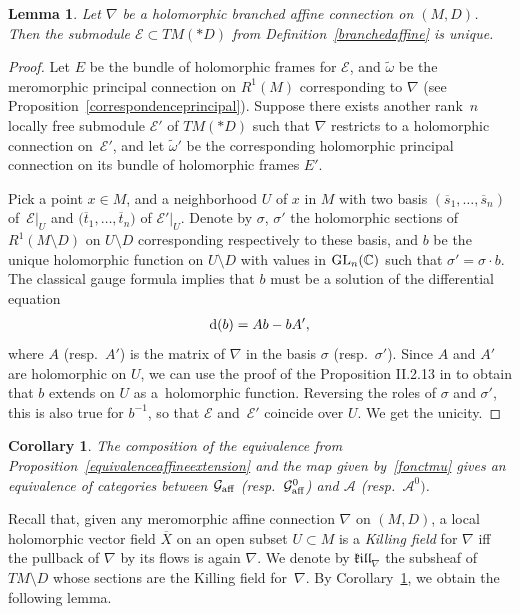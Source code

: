 \documentclass[pdftex]{sigma}
\numberwithin{equation}{section}
\newtheorem{Corollary}[Theorem]{Corollary}
\newtheorem{Lemma}[Theorem]{Lemma}
\begin{document}
 \begin{Lemma}\label{lemmabranchedaffine} Let $\nabla$ be a holomorphic branched affine connection on $(M,D)$. Then the submodule $\mathcal{E}\subset TM(* D)$ from Definition~{\rm \ref{branchedaffine}} is unique. \end{Lemma}
 \begin{proof} Let $E$ be the bundle of holomorphic frames for $\mathcal{E}$, and $\tilde{\omega}$ be the meromorphic principal connection on $R^1(M)$ corresponding to $\nabla$ (see Proposition~\ref{correspondenceprincipal}). Suppose there exists another rank~$n$ locally free submodule $\mathcal{E}'$ of $TM(* D)$ such that $\nabla$ restricts to a holomorphic connection on~$\mathcal{E}'$, and let $\tilde{\omega}'$ be the corresponding holomorphic principal connection on its bundle of holomorphic frames $E'$.

 Pick a point $x\in M$, and a neighborhood $U$ of $x$ in $M$ with two basis $(\overline{s}_1,\dots,\overline{s}_n)$ of~$\mathcal{E}\vert_U$ and $\big(\overline{t}_1,\dots,\overline{t}_n\big)$ of $\mathcal{E}'\vert_U$. Denote by $\sigma$, $\sigma'$ the holomorphic sections of $R^1(M\setminus D)$ on $U\setminus D$ corresponding respectively to these basis, and $b$ be the unique holomorphic function on $U\setminus D$ with values in ${\rm GL}_n(\mathbb{C})$ such that $\sigma'=\sigma\cdot b$. The classical gauge formula implies that $b$ must be a solution of the differential equation
 \begin{gather*} {\rm d}(b) = Ab - bA', \end{gather*}
 where $A$ (resp.\ $A'$) is the matrix of $\nabla$ in the basis $\sigma$ (resp.\ $\sigma'$). Since $A$ and $A'$ are holomorphic on $U$, we can use the proof of the Proposition II.2.13 in \cite{Sabbah} to obtain that $b$ extends on $U$ as a~holomorphic function. Reversing the roles of $\sigma$ and $\sigma'$, this is also true for $b^{-1}$, so that $\mathcal{E}$ and~$\mathcal{E}'$ coincide over $U$. We get the unicity.
 \end{proof}

\begin{Corollary}\label{equivalencetorsion} The composition of the equivalence from Proposition~{\rm \ref{equivalenceaffineextension}} and the map given by~\eqref{fonctmu} gives an equivalence of categories between $\mathcal{G}_{\rm aff}$ \big(resp.\ $\mathcal{G}_{\rm aff}^0$\big) and $\mathcal{A}$ \big(resp.\ $\mathcal{A}^0\big)$.
\end{Corollary}
Recall that, given any meromorphic affine connection $\nabla$ on $(M,D)$, a local holomorphic vector field $\overline{X}$ on an open subset $U\subset M$ is a \textit{Killing field} for $\nabla$ iff the pullback of $\nabla$ by its flows is again $\nabla$. We denote by $\mathfrak{k}\mathfrak{i}\mathfrak{l}\mathfrak{l}_{\nabla}$ the subsheaf of $TM\setminus D$ whose sections are the Killing field for~$\nabla$. By Corollary~\ref{equivalencetorsion}, we obtain the following lemma.
\end{document}
